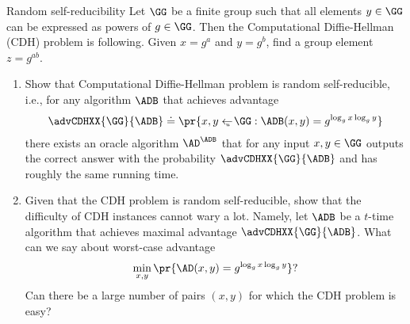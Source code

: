 \documentclass{crypto-exercise}
\begin{document}
\begin{exercise}{Random self-reducibility}
  Let $\GG$ be a finite group such that all elements $y\in\GG$ can be
  expressed as powers of $g\in\GG$. Then the Computational
  Diffie-Hellman (CDH) problem is following. Given $x=g^a$ and
  $y=g^b$, find a group element $z=g^{ab}$.
  \begin{enumerate}
  \item Show that Computational Diffie-Hellman problem is random
    self-reducible, i.e., for any algorithm $\ADB$ that achieves
    advantage
    \begin{align*}
      \advCDHXX{\GG}{\ADB}\doteq\pr{x,y\getsu\GG: \ADB(x,y)=g^{\log_g
          x\log_g y}}
    \end{align*}
    there exists an oracle algorithm $\AD^{\ADB}$ that for any input
    $x,y\in\GG$ outputs the correct answer with the probability
    $\advCDHXX{\GG}{\ADB}$ and has roughly the same running time.
  \item Given that the CDH problem is random self-reducible, show that
    the difficulty of CDH instances cannot wary a lot. Namely, let
    $\ADB$ be a $t$-time algorithm that achieves maximal advantage
    $\advCDHXX{\GG}{\ADB}$. What can we say about worst-case advantage
    \begin{align*}
      \min_{x,y}\pr{\AD(x,y)=g^{\log_g x\log_g y}}?
    \end{align*}
    Can there be a large number of pairs $(x,y)$ for which the CDH problem
    is easy?
  \end{enumerate}
\end{exercise}
  
\end{document}
